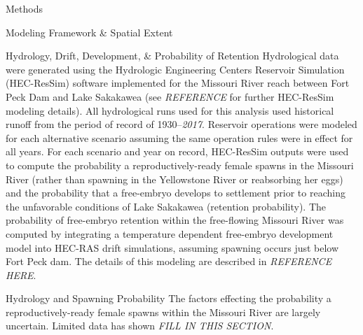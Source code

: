 \documentclass[12pt]{article}
\begin{document}
\begin{section}{Methods}
\begin{subsection}{Modeling Framework \& Spatial Extent}
\begin{subsubsection}{Hydrology, Drift, Development, \& Probability of Retention}
Hydrological data were generated using the Hydrologic Engineering Centers Reservoir Simulation (HEC-ResSim) software implemented for the Missouri River reach between Fort Peck Dam and Lake Sakakawea (see \textit{REFERENCE} for further HEC-ResSim modeling details).  All hydrological runs used for this analysis used historical runoff from the period of record of 1930--\textit{2017}.  Reservoir operations were modeled for each alternative scenario assuming the same operation rules were in effect for all years.   For each scenario and year on record, HEC-ResSim outputs were used to compute the probability a reproductively-ready female spawns in the Missouri River (rather than spawning in the Yellowstone River or reabsorbing her eggs) and the probability that a free-embryo develops to settlement prior to reaching the unfavorable conditions of Lake Sakakawea (retention probability). The probability of free-embryo retention within the free-flowing Missouri River was computed by integrating a temperature dependent free-embryo development model into HEC-RAS drift simulations, assuming spawning occurs just below Fort Peck dam.  The details of this modeling are described in \textit{REFERENCE HERE}.  
\end{subsubsection}

\begin{subsubsection}{Hydrology and Spawning Probability}
The factors effecting the probability a reproductively-ready female spawns within the Missouri River are largely uncertain.  Limited data has shown \textit{FILL IN THIS SECTION}.\\
 

\end{subsubsection}
\end{subsection}
\end{section}
\end{document}
